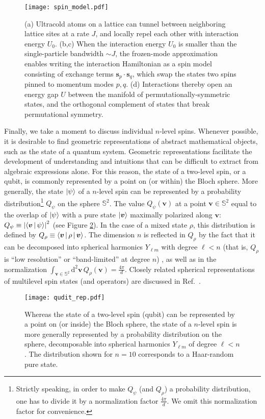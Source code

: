 \documentclass[nofootinbib,twocolumn]{revtex4-2}
\newcommand{\p}[1]{\left(#1\right)} %
\newcommand{\bk}{\Braket} %
\renewcommand{\v}{\bm} %
\renewcommand{\c}{\cdot} %
\renewcommand{\dd}{\text{d}} %
\newcommand{\1}{\mathds{1}}
\renewcommand{\SS}{\mathbb{S}}
\begin{document}
\begin{figure}
\centering
\texttt{[image: spin\_model.pdf]}
\caption{
(a) Ultracold atoms on a lattice can tunnel between neighboring lattice sites at a rate $J$, and locally repel each other with interaction energy $U_0$.
(b,c) When the interaction energy $U_0$ is smaller than the single-particle bandwidth $\sim J$, the frozen-mode approximation enables writing the interaction Hamiltonian as a spin model consisting of exchange terms $\v s_p\c\v s_q$, which swap the states two spins pinned to momentum modes $p,q$.
(d) Interactions thereby open an energy gap $U$ between the manifold of permutationally-symmetric states, and the orthogonal complement of states that break permutational symmetry.
}
\label{fig:spin_model}
\end{figure}

Finally, we take a moment to discuss individual $n$-level spins.
Whenever possible, it is desirable to find geometric representations of abstract mathematical objects, such as the state of a quantum system.
Geometric representations facilitate the development of understanding and intuitions that can be difficult to extract from algebraic expressions alone.
For this reason, the state of a two-level spin, or a qubit, is commonly represented by a point on (or within) the Bloch sphere.
More generally, the state $\ket\psi$ of a $n$-level spin can be represented by a probability distribution\footnote{Strictly speaking, in order to make $Q_\psi$ (and $Q_\rho$) a probability distribution, one has to divide it by a normalization factor $\frac{4\pi}{d}$.
We omit this normalization factor for convenience.} $Q_\psi$ on the sphere $\SS^2$.
The value $Q_\psi\p{\v v}$ at a point $\v v\in\SS^2$ equal to the overlap of $\ket\psi$ with a pure state $\ket{\v v}$ maximally polarized along $\v v$: $Q_\psi\equiv\abs{\bk{\v v|\psi}}^2$ (see Figure \ref{fig:spin_dist}).
In the case of a mixed state $\rho$, this distribution is defined by $Q_\rho\equiv\bk{\v v|\rho|\v v}$.
The dimension $n$ is reflected in $Q_\rho$ by the fact that it can be decomposed into spherical harmonics $Y_{\ell m}$ with degree $\ell<n$ (that is, $Q_\rho$ is ``low resolution'' or ``band-limited'' at degree $n$) \cite{perlin2020qudit}, as well as in the normalization $\int_{\v v\in\SS^2}\dd^2\v v\,Q_\rho\p{\v v}=\frac{4\pi}{d}$.
Closely related spherical representations of multilevel spin states (and operators) are discussed in Ref.~\cite{li2013weylwignermoyal}.

\begin{figure}
\centering
\texttt{[image: qudit\_rep.pdf]}
\caption{
Whereas the state of a two-level spin (qubit) can be represented by a point on (or inside) the Bloch sphere, the state of a $n$-level spin is more generally represented by a probability distribution on the sphere, decomposable into spherical harmonics $Y_{\ell m}$ of degree $\ell<n$.
The distribution shown for $n=10$ corresponds to a Haar-random pure state.
}
\label{fig:spin_dist}
\end{figure}
\end{document}
